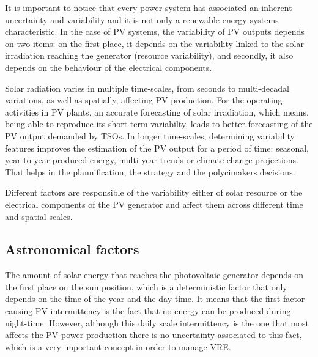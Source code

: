 It is important to notice that every power system has associated an inherent uncertainty and variability and it is not only a renewable energy systems characteristic. In the case of PV systems, the variability of PV outputs depends on two items: on the first place, it depends on the variability linked to the solar irradiation reaching the generator (resource variability), and secondly, it also depends on the behaviour of the electrical components.  

{\color{red}Solar radiation varies in multiple time-scales, from seconds to multi-decadal variations, as well as spatially, affecting PV production. For the operating activities in PV plants, an accurate forecasting of solar irradiation, which means, being able to reproduce its short-term variabilty, leads to better forecasting of the PV output demanded by TSOs. In longer time-scales, determining variability features improves the estimation of the PV output for a period of time: seasonal, year-to-year produced energy, multi-year trends or climate change projections. That helps in the plannification, the strategy and the polycimakers decisions.}  

{\color{red}Different factors are responsible of the variability either of solar resource or the electrical components of the PV generator and affect them across different time and spatial scales.}

\subsection{Astronomical factors}

The amount of solar energy that reaches the photovoltaic generator depends on the first place on the sun position, which is a deterministic factor that only depends on the time of the year and the day-time. It means that the first factor causing PV intermittency is the fact that no energy can be produced during night-time. However, although this daily scale intermittency is the one that most affects the PV power production there is no uncertainty associated to this fact, which is a very important concept in order to manage VRE.

